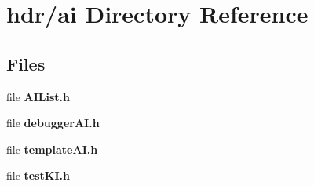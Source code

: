 \section{hdr/ai Directory Reference}
\label{dir_04cf6b94e5f246ace4dcca20476db399}
\subsection*{Files}
\begin{DoxyCompactItemize}
\item 
file {\bfseries A\-I\-List.\-h}
\item 
file {\bfseries debugger\-A\-I.\-h}
\item 
file {\bfseries template\-A\-I.\-h}
\item 
file {\bfseries test\-K\-I.\-h}
\end{DoxyCompactItemize}
